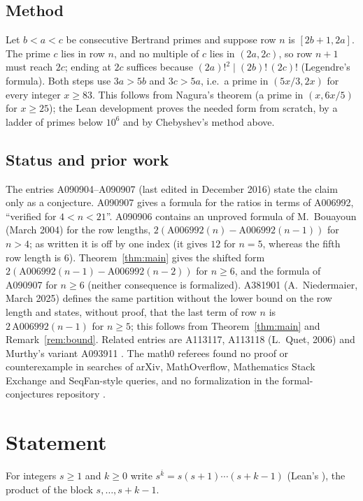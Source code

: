 \documentclass[11pt]{amsart}
\theoremstyle{plain}
\theoremstyle{definition}
\newcommand{\rf}[2]{#1^{\overline{#2}}}
\begin{document}
\subsection*{Method}
Let $b<a<c$ be consecutive Bertrand primes and suppose row $n$ is $[2b+1,2a]$. The prime $c$ lies in row $n$, and no multiple of $c$ lies in $(2a,2c)$, so row $n+1$ must reach $2c$; ending at $2c$ suffices because $(2a)!^2\mid(2b)!\,(2c)!$ (Legendre's formula). Both steps use $3a>5b$ and $3c>5a$, i.e.\ a prime in $(5x/3,2x)$ for every integer $x\ge83$. This follows from Nagura's theorem \cite{Nag} (a prime in $(x,6x/5)$ for $x\ge25$); the Lean development proves the needed form from scratch, by a ladder of primes below $10^6$ and by Chebyshev's method \cite{Cheb} above.

\subsection*{Status and prior work}
The entries A090904--A090907 (last edited in December 2016) state the claim only as a conjecture. A090907 \cite{A090904} gives a formula for the ratios in terms of A006992, ``verified for $4<n<21$''. A090906 \cite{A090904} contains an unproved formula of M.~Bouayoun (March 2004) for the row lengths, $2(\mathrm{A006992}(n)-\mathrm{A006992}(n-1))$ for $n>4$; as written it is off by one index (it gives $12$ for $n=5$, whereas the fifth row length is $6$). Theorem~\ref{thm:main} gives the shifted form $2(\mathrm{A006992}(n-1)-\mathrm{A006992}(n-2))$ for $n\ge6$, and the formula of A090907 for $n\ge6$ (neither consequence is formalized). A381901 \cite{A381901} (A.~Niedermaier, March 2025) defines the same partition without the lower bound on the row length and states, without proof, that the last term of row $n$ is $2\,\mathrm{A006992}(n-1)$ for $n\ge5$; this follows from Theorem~\ref{thm:main} and Remark~\ref{rem:bound}. Related entries are A113117, A113118 (L.~Quet, 2006) and Murthy's variant A093911 \cite{A093911}. The math0 referees found no proof or counterexample in searches of arXiv, MathOverflow, Mathematics Stack Exchange and SeqFan-style queries, and no formalization in the formal-conjectures repository \cite{FC}.

\section{Statement}\label{sec:statement}

For integers $s\ge1$ and $k\ge0$ write $\rf{s}{k}=s(s+1)\cdots(s+k-1)$ (Lean's ), the product of the block $s,\dots,s+k-1$.
\end{document}
